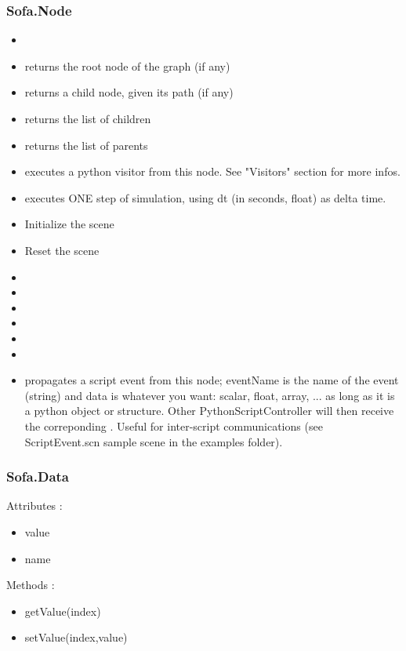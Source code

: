 \subsubsection{Sofa.Node}
\begin{itemize}
\item {} 
\item {} returns the root node of the graph (if any) 
\item {} returns a child node, given its path (if any) 
\item {} returns the list of children 
\item {} returns the list of parents
\item {} executes a python visitor from this node. See "Visitors" section for more infos.
\item {} executes ONE step of simulation, using dt (in seconds, float) as delta time. 
\item {} Initialize the scene 
\item {} Reset the scene 
\item {} 
\item {} 
\item {} 
\item {} 
\item {} 
\item {} 
\item {} propagates a script event from this node; eventName is the name of the event (string) and data is whatever you want: scalar, float, array, ... as long as it is a python object or structure. Other PythonScriptController will then receive the correponding . Useful for inter-script communications (see ScriptEvent.scn sample scene in the examples folder).
\end{itemize}


\subsubsection{Sofa.Data}
Attributes :
\begin{itemize}
\item value
\item name
\end{itemize}
Methods :
\begin{itemize}
\item getValue(index)
\item setValue(index,value)
\end{itemize}

